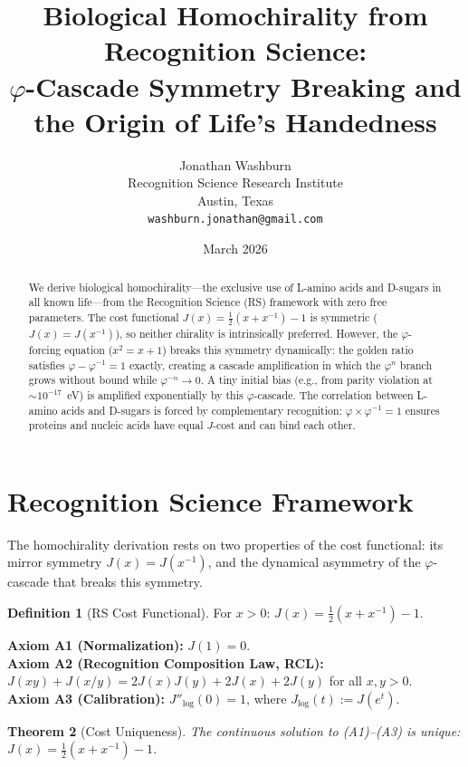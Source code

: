 \documentclass[12pt,a4paper]{article}
\title{Biological Homochirality from Recognition Science:\\
$\varphi$-Cascade Symmetry Breaking and the Origin of Life's Handedness}
\author{Jonathan Washburn\\
Recognition Science Research Institute\\
Austin, Texas\\
\texttt{washburn.jonathan@gmail.com}}
\date{March 2026}
\newtheorem{theorem}{Theorem}[section]
\theoremstyle{definition}
\newtheorem{definition}[theorem]{Definition}
\theoremstyle{remark}
\begin{document}
\maketitle

\begin{abstract}
We derive biological homochirality---the exclusive use of L-amino acids
and D-sugars in all known life---from the Recognition Science (RS)
framework with zero free parameters.  The cost functional
$J(x) = \tfrac{1}{2}(x + x^{-1}) - 1$ is symmetric
($J(x) = J(x^{-1})$), so neither chirality is intrinsically
preferred.  However, the $\varphi$-forcing equation ($x^2 = x + 1$)
breaks this symmetry dynamically: the golden ratio satisfies
$\varphi - \varphi^{-1} = 1$ exactly, creating a cascade amplification
in which the $\varphi^n$ branch grows without bound while
$\varphi^{-n} \to 0$.  A tiny initial bias (e.g., from parity
violation at $\sim 10^{-17}$~eV) is amplified exponentially by this
$\varphi$-cascade.  The correlation between L-amino acids and D-sugars
is forced by complementary recognition: $\varphi \times \varphi^{-1}
= 1$ ensures proteins and nucleic acids have equal $J$-cost and can
bind each other.  \end{abstract}

\section{Recognition Science Framework}
\label{sec:framework}

The homochirality derivation rests on two properties of the cost
functional: its mirror symmetry $J(x) = J(x^{-1})$, and the dynamical
asymmetry of the $\varphi$-cascade that breaks this symmetry.

\begin{definition}[RS Cost Functional]
For $x > 0$: $J(x) = \tfrac{1}{2}(x + x^{-1}) - 1$.
\end{definition}

\noindent\textbf{Axiom A1 (Normalization):} $J(1) = 0$.\\
\textbf{Axiom A2 (Recognition Composition Law, RCL):}
$J(xy)+J(x/y)=2J(x)J(y)+2J(x)+2J(y)$ for all $x,y>0$.\\
\textbf{Axiom A3 (Calibration):} $J''_{\log}(0) = 1$, where
$J_{\log}(t) := J(e^t)$.

\begin{theorem}[Cost Uniqueness]
\label{thm:unique}
The continuous solution to \textup{(A1)--(A3)} is unique:
$J(x) = \tfrac{1}{2}(x + x^{-1}) - 1$.
\end{theorem}
\end{document}
